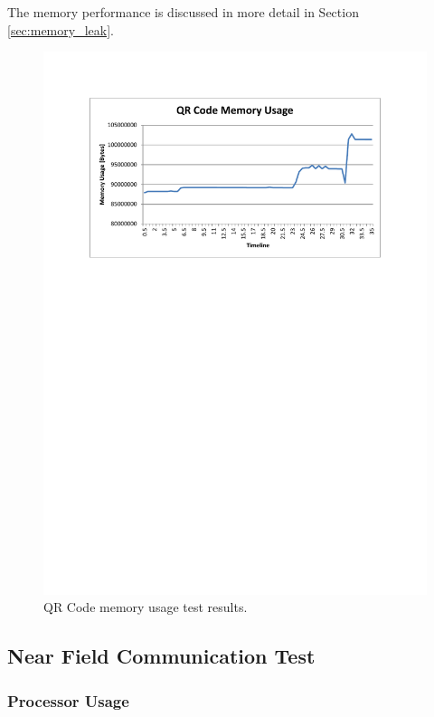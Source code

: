 The memory performance is discussed in more detail in Section \ref{sec:memory_leak}.

\begin{figure}
 \centering 
 \includegraphics[clip=true, trim = 0 520 0 70,
 scale=0.7]{qrcode_test_mem}
 \caption{QR Code memory usage test results.}
 \label{fig:qrcode_test_mem}
\end{figure}

\subsection{Near Field Communication Test}

\subsubsection{Processor Usage}

